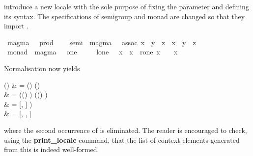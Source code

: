 \begin{isabellebody}
\begin{isamarkuptext}
  introduce a new locale  with the sole purpose of fixing the
  parameter and defining its syntax.  The specifications of semigroup
  and monad are changed so that they import .%
\end{isamarkuptext}%
\isamarkuptrue%
\isamarkupfalse%
\ magma\ {\isacharequal}\ \ prod\ {\isacharparenleft}\ {\isachardoublequoteopen}{\isasymcdot}{\isachardoublequoteclose}\ {}{}{\isacharparenright}\isanewline
\isanewline
{}\isamarkupfalse%
\ semi{\isacharprime}\ {\isacharequal}\ magma\ {\isacharplus}\ \ assoc{\isacharcolon}\ {\isachardoublequoteopen}{\isacharparenleft}x\ {\isasymcdot}\ y{\isacharparenright}\ {\isasymcdot}\ z\ {\isacharequal}\ x\ {\isasymcdot}\ {\isacharparenleft}y\ {\isasymcdot}\ z{\isacharparenright}{\isachardoublequoteclose}\isanewline
{}\isamarkupfalse%
\ monad{\isacharprime}\ {\isacharequal}\ magma\ {\isacharplus}\ \ one\ {\isacharparenleft}{\isachardoublequoteopen}{\isasymone}{\isachardoublequoteclose}\ {}{}{}{\isacharparenright}\isanewline
\ \ \ l{\isacharunderscore}one{\isacharcolon}\ {\isachardoublequoteopen}{\isasymone}\ {\isasymcdot}\ x\ {\isacharequal}\ x{\isachardoublequoteclose}\ \ r{\isacharunderscore}one{\isacharcolon}\ {\isachardoublequoteopen}x\ {\isasymcdot}\ {\isasymone}\ {\isacharequal}\ x{\isachardoublequoteclose}%
\begin{isamarkuptext}%
Normalisation now yields
\begin{align*%
}
  \N() & =
       \N() \App \N() \\
     & = (\N() ) \App
         (\N() ) \\
     & = [, ] ) \\
     & = [, ,
          ]
\end{align*%
}
  where the second occurrence of  is eliminated.
  The reader is encouraged to check, using the \textbf{print\_locale}
  command, that the list of context elements generated from this is
  indeed well-formed.


\end{isamarkuptext}
\end{isabellebody}
